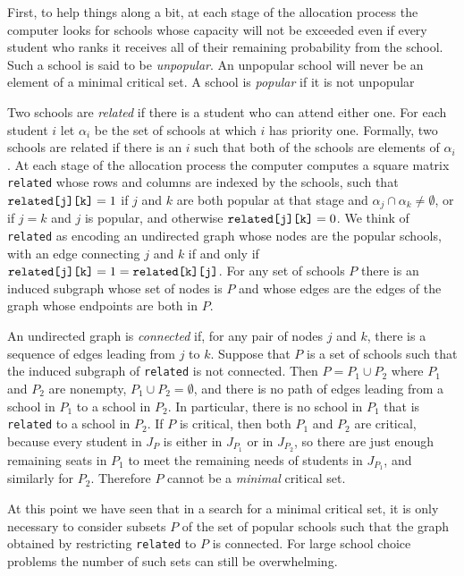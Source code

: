 \documentclass[12pt]{article}
\theoremstyle{definition}
\begin{document}
First, to help things along a bit, at each stage of the allocation
process the computer looks for schools whose capacity will not be
exceeded even if every student who ranks it receives all of their
remaining probability from the school.  Such a school is said to be
\emph{unpopular}.  An unpopular school will never be an element of a
minimal critical set. A school is \emph{popular} if it is not
unpopular

Two schools are \emph{related} if there is a student who can attend
either one.  For each student $i$ let $\alpha_i$ be the set of schools
at which $i$ has priority one.  Formally, two schools are related if
there is an $i$ such that both of the schools are elements of
$\alpha_i$.  At each stage of the allocation process the computer
computes a square matrix \texttt{related} whose rows and columns are
indexed by the schools, such that $\text{\texttt{related[j][k]}} = 1$
if $j$ and $k$ are both popular at that stage and $\alpha_j \cap
\alpha_k \ne \emptyset$, or if $j = k$ and $j$ is popular, and
otherwise $\text{\texttt{related[j][k]}} = 0$.  We think of
\texttt{related} as encoding an undirected graph whose nodes are the
popular schools, with an edge connecting $j$ and $k$ if and only if
$\text{\texttt{related[j][k]}} = 1 = \text{\texttt{related[k][j]}}$.
For any set of schools $P$ there is an induced subgraph whose set of
nodes is $P$ and whose edges are the edges of the graph whose
endpoints are both in $P$.

An undirected graph is \emph{connected} if, for any pair of nodes $j$
and $k$, there is a sequence of edges leading from $j$ to $k$.
Suppose that $P$ is a set of schools such that the induced subgraph of
\texttt{related} is not connected.  Then $P = P_1 \cup P_2$ where
$P_1$ and $P_2$ are nonempty, $P_1 \cup P_2 = \emptyset$, and there is
no path of edges leading from a school in $P_1$ to a school in $P_2$.
In particular, there is no school in $P_1$ that is \texttt{related} to
a school in $P_2$.  If $P$ is critical, then both $P_1$ and $P_2$ are
critical, because every student in $J_P$ is either in $J_{P_1}$ or in
$J_{P_2}$, so there are just enough remaining seats in $P_1$ to meet
the remaining needs of students in $J_{P_1}$, and similarly for $P_2$.
Therefore $P$ cannot be a \emph{minimal} critical set.

At this point we have seen that in a search for a minimal critical
set, it is only necessary to consider subsets $P$ of the set of
popular schools such that the graph obtained by restricting
\texttt{related} to $P$ is connected.  For large school choice
problems the number of such sets can still be overwhelming.
\end{document}
